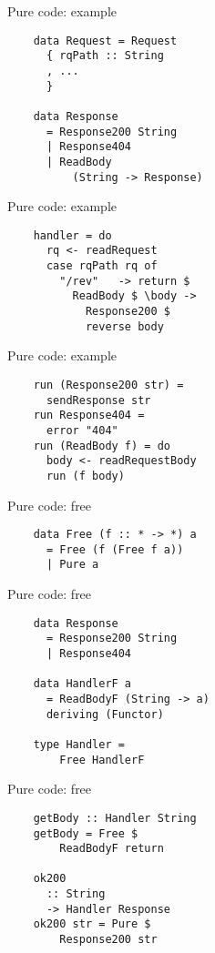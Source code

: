 \documentclass[20pt]{beamer}
\begin{document}
\begin{frame}[fragile]{Pure code: example}
    \begin{lstlisting}
    data Request = Request
      { rqPath :: String
      , ...
      }

    data Response
      = Response200 String
      | Response404
      | ReadBody
          (String -> Response)
    \end{lstlisting}
\end{frame}

\begin{frame}[fragile]{Pure code: example}
    \begin{lstlisting}
    handler = do
      rq <- readRequest
      case rqPath rq of
        "/rev"   -> return $
          ReadBody $ \body ->
            Response200 $
            reverse body
    \end{lstlisting}
\end{frame}

\begin{frame}[fragile]{Pure code: example}
    \begin{lstlisting}
    run (Response200 str) =
      sendResponse str
    run Response404 =
      error "404"
    run (ReadBody f) = do
      body <- readRequestBody
      run (f body)
    \end{lstlisting}
\end{frame}

\begin{frame}[fragile]{Pure code: free}
    \begin{lstlisting}
    data Free (f :: * -> *) a
      = Free (f (Free f a))
      | Pure a
    \end{lstlisting}
\end{frame}

\begin{frame}[fragile]{Pure code: free}
    \begin{lstlisting}
    data Response
      = Response200 String
      | Response404

    data HandlerF a
      = ReadBodyF (String -> a)
      deriving (Functor)

    type Handler =
        Free HandlerF
    \end{lstlisting}
\end{frame}

\begin{frame}[fragile]{Pure code: free}
    \begin{lstlisting}
    getBody :: Handler String
    getBody = Free $
        ReadBodyF return

    ok200
      :: String
      -> Handler Response
    ok200 str = Pure $
        Response200 str
    \end{lstlisting}
\end{frame}
\end{document}
